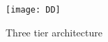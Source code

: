 \begin{figure}[h]
    \centering
    \texttt{[image: DD]}
    \caption{Three tier architecture \cite{MToC_2023}}
    \label{fig:enter-label}
\end{figure}